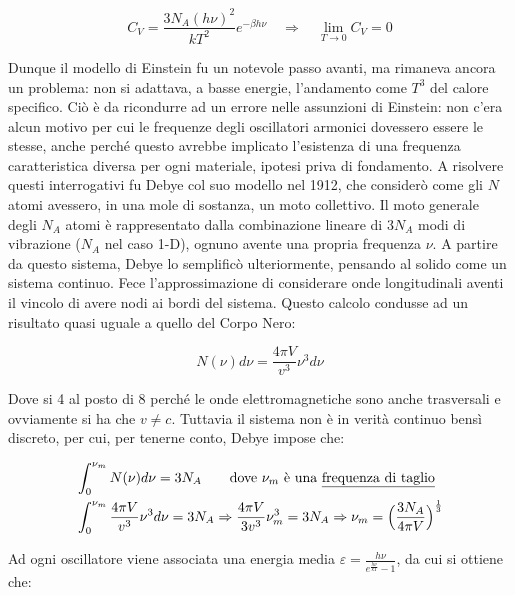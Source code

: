 \begin{equation}
C_V = \frac{ 3 N_A (h \nu)^2}{k T^2 }e^{ - \beta h \nu } \quad \Rightarrow \quad \lim_{T \to 0} C_V = 0
\end{equation}

Dunque il modello di Einstein fu un notevole passo avanti, ma rimaneva ancora un problema: non si adattava, a basse energie, l'andamento come $T^3$ del calore specifico.
Ciò è da ricondurre ad un errore nelle assunzioni di Einstein: non c'era alcun motivo per cui le frequenze degli oscillatori armonici dovessero essere le stesse, anche perché questo avrebbe implicato l'esistenza di una frequenza caratteristica diversa per ogni materiale, ipotesi priva di fondamento.
A risolvere questi interrogativi fu Debye col suo modello nel 1912, che considerò come gli $N$ atomi avessero, in una mole di sostanza, un moto collettivo.
Il moto generale degli $N_A$ atomi è rappresentato dalla combinazione lineare di $3N_A$ modi di vibrazione ($N_A$ nel caso 1-D), ognuno avente una propria frequenza $\nu$.
A partire da questo sistema, Debye lo semplificò ulteriormente, pensando al solido come un sistema continuo.
Fece l'approssimazione di considerare onde longitudinali aventi il vincolo di avere nodi ai bordi del sistema.
Questo calcolo condusse ad un risultato quasi uguale a quello del Corpo Nero:

\begin{equation}
N(\nu)d\nu = \frac{ 4 \pi V}{v^3 } \nu^3 d\nu
\end{equation}

Dove si 4 al posto di 8 perché le onde elettromagnetiche sono anche trasversali e ovviamente si ha che $v \not = c$.
Tuttavia il sistema non è in verità continuo bensì discreto, per cui, per tenerne conto, Debye impose che:

\begin{equation}
\begin{split}
& \int_0^{\nu_m} N(\nu)d\nu = 3 N_A \quad \quad \mbox{dove $\nu_m$ è una \underline{frequenza di taglio}} \\
& \int_0^{\nu_m} \frac{ 4 \pi V}{v^3 } \nu^3 d\nu = 3 N_A \Rightarrow \frac{ 4 \pi V}{3 v^3 } \nu_m^3 = 3N_A \Rightarrow \nu_m = \Bigl(  \frac{ 3 N_A}{4 \pi V }  \Bigr)^{ \frac{ 1}{3 } }
\end{split}
\end{equation}

Ad ogni oscillatore viene associata una energia media $\varepsilon = \frac{ h \nu}{e^{ \frac{ h \nu}{k T } } - 1 }$, da cui si ottiene che:

